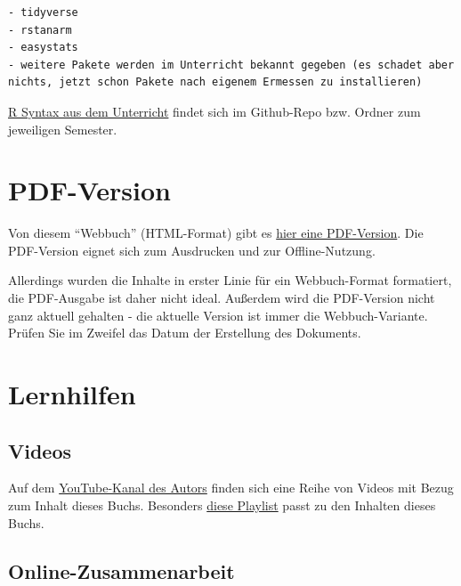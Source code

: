 \documentclass[
  a4paper,
  DIV=11]{scrreprt}
\theoremstyle{definition}
\theoremstyle{remark}
\begin{document}
\begin{verbatim}
- tidyverse
- rstanarm
- easystats
- weitere Pakete werden im Unterricht bekannt gegeben (es schadet aber nichts, jetzt schon Pakete nach eigenem Ermessen zu installieren)
\end{verbatim}

\href{https://github.com/sebastiansauer/Lehre}{R Syntax aus dem
Unterricht} findet sich im Github-Repo bzw. Ordner zum jeweiligen
Semester.

\hypertarget{pdf-version}{%
\section*{PDF-Version}\label{pdf-version}}

Von diesem ``Webbuch'' (HTML-Format) gibt es
\href{_book/Start-Bayes!.pdf}{hier eine PDF-Version}. Die PDF-Version
eignet sich zum Ausdrucken und zur Offline-Nutzung.

Allerdings wurden die Inhalte in erster Linie für ein Webbuch-Format
formatiert, die PDF-Ausgabe ist daher nicht ideal. Außerdem wird die
PDF-Version nicht ganz aktuell gehalten - die aktuelle Version ist immer
die Webbuch-Variante. Prüfen Sie im Zweifel das Datum der Erstellung des
Dokuments.

\hypertarget{lernhilfen}{%
\section*{Lernhilfen}\label{lernhilfen}}

\hypertarget{videos}{%
\subsection*{Videos}\label{videos}}

Auf dem
\href{https://www.youtube.com/channel/UCkvdtj8maE7g-SOCh4aDB9g}{YouTube-Kanal
des Autors} finden sich eine Reihe von Videos mit Bezug zum Inhalt
dieses Buchs. Besonders
\href{https://www.youtube.com/playlist?list=PLRR4REmBgpIGVptiSN-qDVEJKfFnUqDyL}{diese
Playlist} passt zu den Inhalten dieses Buchs.

\hypertarget{online-zusammenarbeit}{%
\subsection*{Online-Zusammenarbeit}\label{online-zusammenarbeit}}
\end{document}
